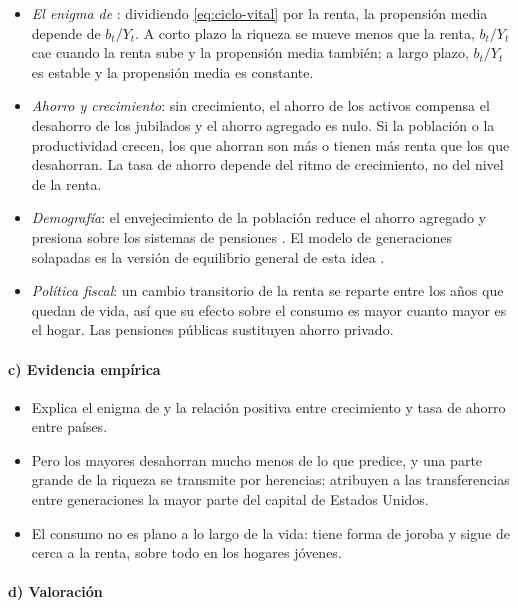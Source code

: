 \documentclass[11pt]{article}
\begin{document}
\begin{itemize}
\item \emph{El enigma de }: dividiendo \eqref{eq:ciclo-vital} por la renta, la propensión media depende de $b_t/Y_t$. A corto plazo la riqueza se mueve menos que la renta, $b_t/Y_t$ cae cuando la renta sube y la propensión media también; a largo plazo, $b_t/Y_t$ es estable y la propensión media es constante.
\item \emph{Ahorro y crecimiento}: sin crecimiento, el ahorro de los activos compensa el desahorro de los jubilados y el ahorro agregado es nulo. Si la población o la productividad crecen, los que ahorran son más o tienen más renta que los que desahorran. La tasa de ahorro depende del ritmo de crecimiento, no del nivel de la renta\nocite{Modigliani1986Life}.
\item \emph{Demografía}: el envejecimiento de la población reduce el ahorro agregado y presiona sobre los sistemas de pensiones  . El modelo de generaciones solapadas es la versión de equilibrio general de esta idea .
\item \emph{Política fiscal}: un cambio transitorio de la renta se reparte entre los años que quedan de vida, así que su efecto sobre el consumo es mayor cuanto mayor es el hogar. Las pensiones públicas sustituyen ahorro privado.
\end{itemize}

\paragraph{c) Evidencia empírica}

\begin{itemize}
\item Explica el enigma de  y la relación positiva entre crecimiento y tasa de ahorro entre países.
\item Pero los mayores desahorran mucho menos de lo que predice, y una parte grande de la riqueza se transmite por herencias: \textcite{KotlikoffSummers1981Role} atribuyen a las transferencias entre generaciones la mayor parte del capital de Estados Unidos.
\item El consumo no es plano a lo largo de la vida: tiene forma de joroba y sigue de cerca a la renta, sobre todo en los hogares jóvenes\nocite{CarrollSummers1991,GourinchasParker2002}.
\end{itemize}

\paragraph{d) Valoración}
\end{document}

